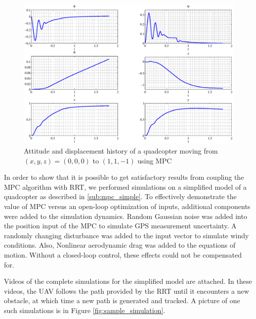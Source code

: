 \begin{figure}[]
\centering
\includegraphics[width=20cm]{line_tracking.eps}
\caption{Attitude and displacement history of a quadcopter moving from $(x,y,z) = (0,0,0)$ to $(1,1,-1)$ using MPC}
\label{fig:line_tracking}
\end{figure}

In order to show that it is possible to get satisfactory results from coupling the MPC algorithm with RRT, we performed simulations on a simplified model of a quadcopter as described in \ref{sub:mpc_simple}. To effectively demonstrate the value of MPC versus an open-loop optimization of inputs, additional components were added to the simulation dynamics.  Random Gaussian noise was added into the position input of the MPC to simulate GPS measurement uncertainty.  A randomly changing disturbance was added to the input vector to simulate windy conditions.  Also, Nonlinear aerodynamic drag was added to the equations of motion. Without a closed-loop control, these effects could not be compensated for.

Videos of the complete simulations for the simplified model are attached. In these videos, the UAV follows the path provided by the RRT until it encounters a new obstacle, at which time a new path is generated and tracked. A picture of one such simulations is in Figure \eqref{fig:sample_simulation}.

